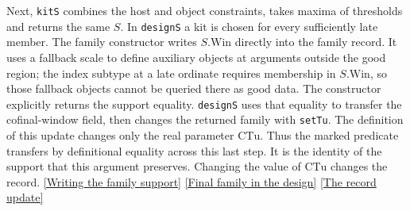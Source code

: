 \documentclass[12pt,letterpaper]{article}
\begin{document}
Next, \texttt{kitS} combines the host and object constraints, takes maxima of thresholds and returns the same \(S\). In \texttt{designS} a kit is chosen for every sufficiently late member. The family constructor writes \(S.\mathrm{Win}\) directly into the family record. It uses a fallback scale to define auxiliary objects at arguments outside the good region; the index subtype at a late ordinate requires membership in \(S.\mathrm{Win}\), so those fallback objects cannot be queried there as good data. The constructor explicitly returns the support equality. \texttt{designS} uses that equality to transfer the cofinal-window field, then changes the returned family with \texttt{setTu}. The definition of this update changes only the real parameter \(\mathrm{CTu}\). Thus the marked predicate transfers by definitional equality across this last step. It is the identity of the support that this argument preserves. Changing the value of \(\mathrm{CTu}\) changes the record.
\href{https://github.com/nousentllc/riemann-hypothesis/blob/40e56bab026552e089d7afcfeff08d2defb9c005/src/Development/AbelianVarietyTheory/Proofs/GlobalInterpolation/ExistsFamPOfKits.lean#L159-L170}{[Writing the family support]}
\href{https://github.com/nousentllc/riemann-hypothesis/blob/40e56bab026552e089d7afcfeff08d2defb9c005/src/Development/AutomorphicArithmetic/CharacterBoxes/DesignS.lean#L89-L96}{[Final family in the design]}
\href{https://github.com/nousentllc/riemann-hypothesis/blob/40e56bab026552e089d7afcfeff08d2defb9c005/src/Development/AbelianVarietyTheory/Definitions/GlobalTwisting/AuxiliaryPrimeMemAvoidedPrimes.lean#L145-L152}{[The record update]}
\end{document}
